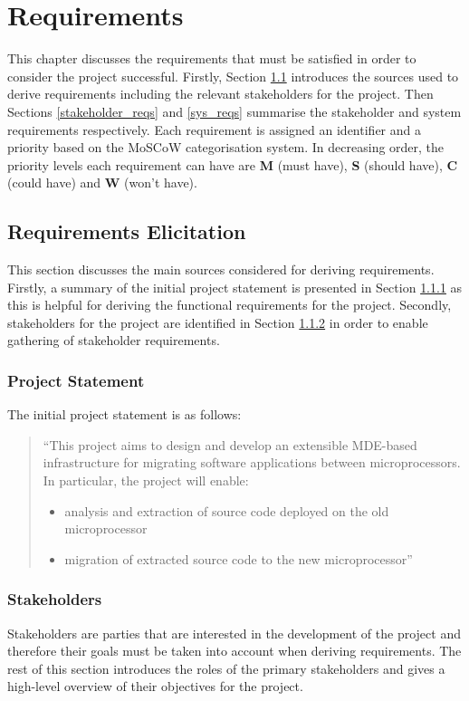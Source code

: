 \documentclass{UoYCSproject}
\begin{document}
\chapter{Requirements}
This chapter discusses the requirements that must be satisfied in order to consider the project successful. Firstly, Section \ref{req_gathering} introduces the sources used to derive requirements including the relevant stakeholders for the project. Then Sections \ref{stakeholder_reqs} and \ref{sys_reqs} summarise the stakeholder and system requirements respectively. Each requirement is assigned an identifier and a priority based on the MoSCoW categorisation system. In decreasing order, the priority levels each requirement can have are \textbf{M} (must have), \textbf{S} (should have), \textbf{C} (could have) and \textbf{W} (won't have).

\section{Requirements Elicitation} \label{req_gathering}
This section discusses the main sources considered for deriving requirements. Firstly, a summary of the initial project statement is presented in Section \ref{proj_stmt} as this is helpful for deriving the functional requirements for the project. Secondly, stakeholders for the project are identified in Section \ref{stakeholders} in order to enable gathering of stakeholder requirements.

\subsection{Project Statement} \label{proj_stmt}
The initial project statement is as follows: 
\begin{quote}
``This project aims to design and develop an extensible MDE-based infrastructure for migrating software applications between microprocessors. In particular, the project will enable:
\begin{itemize}
\item analysis and extraction of source code deployed on the old microprocessor
\item migration of extracted source code to the new microprocessor''
\end{itemize}
\end{quote}

\subsection{Stakeholders} \label{stakeholders}
Stakeholders are parties that are interested in the development of the project and therefore their goals must be taken into account when deriving requirements. The rest of this section introduces the roles of the primary stakeholders and gives a high-level overview of their objectives for the project.
\end{document}
